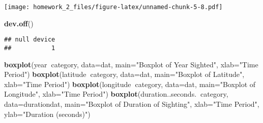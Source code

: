 \documentclass[
]{article}
\newenvironment{Shaded}{\begin{snugshade}}{\end{snugshade}}
\newcommand{\DataTypeTok}[1]{\textcolor[rgb]{0.13,0.29,0.53}{#1}}
\newcommand{\KeywordTok}[1]{\textcolor[rgb]{0.13,0.29,0.53}{\textbf{#1}}}
\newcommand{\NormalTok}[1]{#1}
\newcommand{\OperatorTok}[1]{\textcolor[rgb]{0.81,0.36,0.00}{\textbf{#1}}}
\newcommand{\OtherTok}[1]{\textcolor[rgb]{0.56,0.35,0.01}{#1}}
\newcommand{\StringTok}[1]{\textcolor[rgb]{0.31,0.60,0.02}{#1}}
\begin{document}
\begin{Shaded}
\end{Shaded}

\texttt{[image: homework\_2\_files/figure-latex/unnamed-chunk-5-8.pdf]}

\begin{Shaded}
\begin{Highlighting}[]
\KeywordTok{dev.off}\NormalTok{()}
\end{Highlighting}
\end{Shaded}

\begin{verbatim}
## null device 
##           1
\end{verbatim}

\begin{Shaded}
\begin{Highlighting}[]
\KeywordTok{boxplot}\NormalTok{(year}\OperatorTok{~}\NormalTok{category, }\DataTypeTok{data=}\NormalTok{dat, }\DataTypeTok{main=}\StringTok{"Boxplot of Year Sighted"}\NormalTok{, }\DataTypeTok{xlab=}\StringTok{"Time Period"}\NormalTok{)}
\KeywordTok{boxplot}\NormalTok{(latitude}\OperatorTok{~}\NormalTok{category, }\DataTypeTok{data=}\NormalTok{dat, }\DataTypeTok{main=}\StringTok{"Boxplot of Latitude"}\NormalTok{, }\DataTypeTok{xlab=}\StringTok{"Time Period"}\NormalTok{)}
\KeywordTok{boxplot}\NormalTok{(longitude}\OperatorTok{~}\NormalTok{category, }\DataTypeTok{data=}\NormalTok{dat, }\DataTypeTok{main=}\StringTok{"Boxplot of Longitude"}\NormalTok{, }\DataTypeTok{xlab=}\StringTok{"Time Period"}\NormalTok{)}
\KeywordTok{boxplot}\NormalTok{(duration..seconds.}\OperatorTok{~}\NormalTok{category, }\DataTypeTok{data=}\NormalTok{durationdat, }\DataTypeTok{main=}\StringTok{"Boxplot of Duration of Sighting"}\NormalTok{,}
        \DataTypeTok{xlab=}\StringTok{"Time Period"}\NormalTok{, }\DataTypeTok{ylab=}\StringTok{"Duration (seconds)"}\NormalTok{)}
\end{Highlighting}
\end{Shaded}
\end{document}
